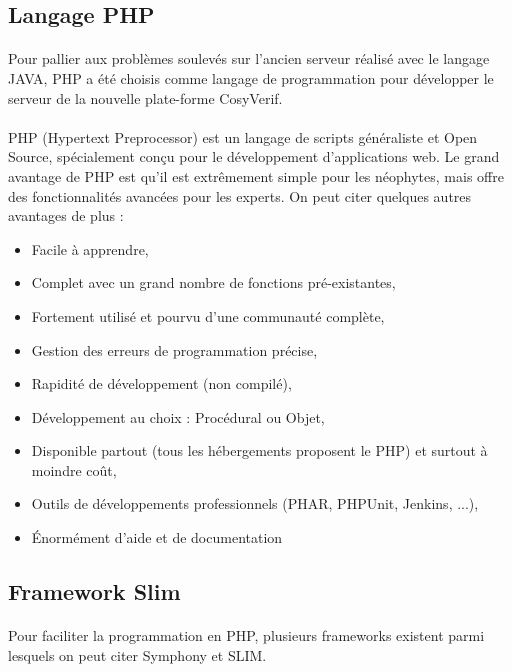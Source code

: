 \documentclass{report}
\begin{document}
\subsection{Langage PHP}

\paragraph{}
Pour pallier aux problèmes soulevés sur l'ancien serveur réalisé avec le langage JAVA, PHP 
a été choisis comme langage de programmation pour développer le serveur de la nouvelle plate-forme CosyVerif.

\paragraph{}
PHP (Hypertext Preprocessor) est un langage de scripts généraliste et Open Source, spécialement conçu pour le 
développement d'applications web. Le grand avantage de PHP est qu'il est extrêmement simple pour les néophytes, 
mais offre des fonctionnalités avancées pour les experts. On peut citer quelques autres avantages de plus : 

\begin{itemize}
\item Facile à apprendre,
\item Complet avec un grand nombre de fonctions pré-existantes,
\item Fortement utilisé et pourvu d'une communauté complète,
\item Gestion des erreurs de programmation précise,
\item Rapidité de développement (non compilé),
\item Développement au choix : Procédural ou Objet,
\item Disponible partout (tous les hébergements proposent le PHP) et surtout à moindre coût,
\item Outils de développements professionnels (PHAR, PHPUnit, Jenkins, ...),
\item Énormément d'aide et de documentation
\end{itemize}

\subsection{Framework Slim}

\paragraph{}
Pour faciliter la programmation en PHP, plusieurs frameworks existent parmi lesquels on peut citer Symphony et SLIM. 
\end{document}
